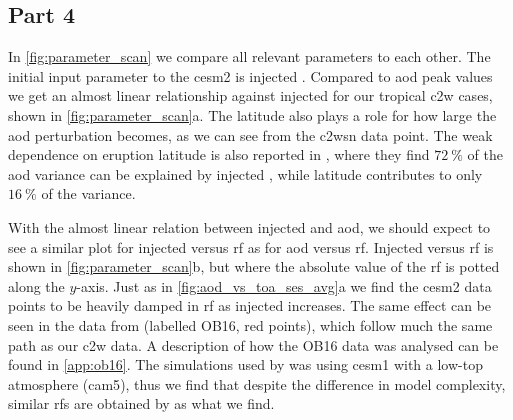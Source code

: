 \documentclass{ametsocV6.1}
\newcommand{\iso}[1][i]{{#1}njected \ce{SO2}}
\begin{document}
\subsection{Part 4}

In \ref{fig:parameter_scan} we compare all relevant parameters to each other. The
initial input parameter to the \gls{cesm2} is injected . Compared to \gls{aod}
peak values we get an almost linear relationship against \iso{} for our tropical
\gls{c2w} cases, shown in \ref{fig:parameter_scan}a. The latitude also plays a role for
how large the \gls{aod} perturbation becomes, as we can see from the \gls{c2wsn} data
point. The weak dependence on eruption latitude is also reported in
\citet{marshall2019}, where they find \(\SI{72}{\percent}\) of the \gls{aod} variance
can be explained by \iso{}, while latitude contributes to only \(\SI{16}{\percent}\) of
the variance.

With the almost linear relation between injected  and \gls{aod}, we should
expect to see a similar plot for \iso{} versus \gls{rf} as for \gls{aod} versus
\gls{rf}. \iso[I] versus \gls{rf} is shown in \ref{fig:parameter_scan}b, but where the
absolute value of the \gls{rf} is potted along the \(y\)-axis. Just as in
\ref{fig:aod_vs_toa_ses_avg}a we find the \gls{cesm2} data points to be heavily damped
in \gls{rf} as \iso{} increases. The same effect can be seen in the data from
\citet{ottobliesner2016} (labelled OB16, red points), which follow much the same path as
our \gls{c2w} data. A description of how the OB16 data was analysed can be found in
\ref{app:ob16}. The simulations used by \citet{ottobliesner2016} was using \gls{cesm1}
with a low-top atmosphere (\gls{cam5}), thus we find that despite the difference in
model complexity, similar \glspl{rf} are obtained by \citet{ottobliesner2016} as what we
find.
\end{document}

